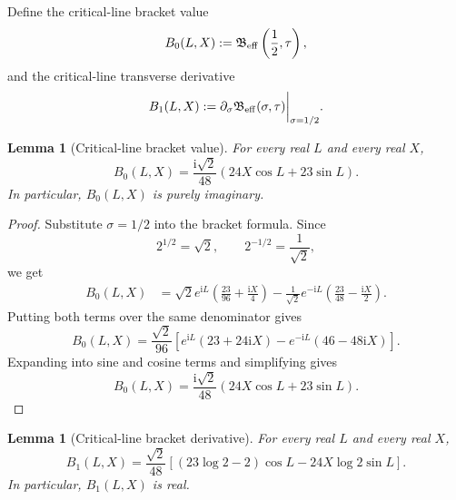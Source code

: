 \documentclass[11pt]{article}
\newtheorem{lemma}[theorem]{Lemma}
\newcommand{\ii}{\mathrm{i}}
\newcommand{\Beff}{\mathfrak B_{\rm eff}}
\begin{document}
Define the critical-line bracket value
\[
        B_0(L,X)
        :=
        \Beff\left(\frac12,\tau\right),
\]
and the critical-line transverse derivative
\[
        B_1(L,X)
        :=
        \partial_\sigma\Beff(\sigma,\tau)\bigg|_{\sigma=1/2}.
\]

\begin{lemma}[Critical-line bracket value]
\label{lem:critical-bracket-value}
For every real \(L\) and every real \(X\),
\[
        B_0(L,X)
        =
        \frac{\ii\sqrt2}{48}
        \left(
        24X\cos L+23\sin L
        \right).
\]
In particular, \(B_0(L,X)\) is purely imaginary.
\end{lemma}

\begin{proof}
Substitute \(\sigma=1/2\) into the bracket formula.  Since
\[
        2^{1/2}=\sqrt2,
        \qquad
        2^{-1/2}=\frac1{\sqrt2},
\]
we get
\[
\begin{aligned}
        B_0(L,X)
        &=
        \sqrt2 e^{\ii L}
        \left(
        \frac{23}{96}
        +
        \frac{\ii X}{4}
        \right)
        -
        \frac1{\sqrt2}e^{-\ii L}
        \left(
        \frac{23}{48}
        -
        \frac{\ii X}{2}
        \right).
\end{aligned}
\]
Putting both terms over the same denominator gives
\[
        B_0(L,X)
        =
        \frac{\sqrt2}{96}
        \left[
        e^{\ii L}(23+24\ii X)
        -
        e^{-\ii L}(46-48\ii X)
        \right].
\]
Expanding into sine and cosine terms and simplifying gives
\[
        B_0(L,X)
        =
        \frac{\ii\sqrt2}{48}
        \left(
        24X\cos L+23\sin L
        \right).
\]
\end{proof}

\begin{lemma}[Critical-line bracket derivative]
\label{lem:critical-bracket-derivative}
For every real \(L\) and every real \(X\),
\[
        B_1(L,X)
        =
        \frac{\sqrt2}{48}
        \left[
        (23\log2-2)\cos L
        -
        24X\log2\sin L
        \right].
\]
In particular, \(B_1(L,X)\) is real.
\end{lemma}
\end{document}
